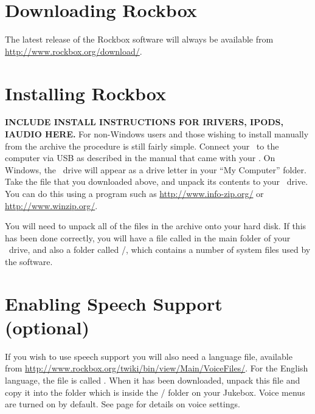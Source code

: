
\section{Downloading Rockbox}
The latest release of the Rockbox software will always be available from \url{http://www.rockbox.org/download/}.  

\section{Installing Rockbox}
\textbf{INCLUDE INSTALL INSTRUCTIONS FOR IRIVERS, IPODS, IAUDIO HERE.}
For non{}-Windows users and those wishing to install manually from the archive
the procedure is still fairly simple.  Connect your \playername\ to the
computer via USB as described in the manual that came with your \playername. On
Windows, the \playername\ drive will appear as a drive letter in your
``My Computer'' folder. Take the file that you downloaded above, and unpack
its contents to your \playername\ drive. You can do this using a program such
as \url{http://www.info-zip.org/} or \url{http://www.winzip.org/}.

You will need to unpack all of the files in the archive onto your hard disk. If this has been done correctly, you will have a file called \fname{\firmwarefilename} in the main folder of your \playername\ drive, and also a folder called /, which contains a number of system files used by the software.

\section{Enabling Speech Support (optional)}
If you wish to use speech support you will also need a language file, available from \url{http://www.rockbox.org/twiki/bin/view/Main/VoiceFiles/}.  For the English language, the file is called . When it has been downloaded, unpack this file and copy it into the  folder which is inside the / folder on your Jukebox. Voice menus are turned on by default. See page \pageref{ref:Voiceconfiguration} for details on voice settings.



